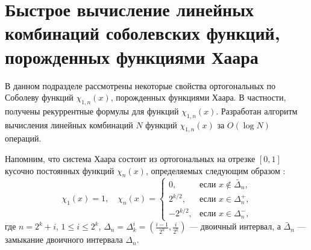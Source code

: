 \section{Быстрое вычисление линейных комбинаций соболевских функций, порожденных функциями Хаара}

В данном подразделе рассмотрены некоторые свойства ортогональных по Соболеву функций $\chi_{1,n}(x)$, порожденных функциями Хаара. В частности, получены рекуррентные формулы для функций $\chi_{1,n}(x)$. Разработан алгоритм вычисления линейных комбинаций $N$ функций $\chi_{1,n}(x)$ за $O(\log N)$ операций.

Напомним, что система Хаара состоит из ортогональных на отрезке $[0,1]$ кусочно постоянных функций $\chi_n(x)$, определяемых следующим образом \cite[глава 3, с. 70]{mmgmsr1-Kashin}:
\begin{equation}\label{mmgmsr1-haar-def}
\chi_1(x)=1, \quad
\chi_n(x)=\begin{cases} 0,&\text{если $x\notin \bar\Delta_n$,}\\
2^{k/2},& \text{если $x\in \Delta_n^+$,}\\
-2^{k/2},& \text{если $x\in \Delta_n^-$,}
\end{cases}
\end{equation}
где $n=2^k+i$, $1 \le i \le 2^k$, $\Delta_n=\Delta_k^i=(\frac{i-1}{2^k},\frac{i}{2^k})$ --- двоичный интервал, а $\bar\Delta_n$ --- замыкание двоичного интервала $\Delta_n$.

